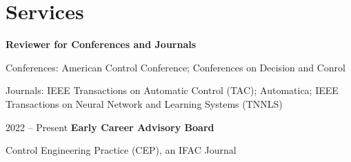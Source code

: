 \section{Services}
\begin{twocolentry}{}
\textbf{Reviewer for Conferences and Journals}\end{twocolentry}
\vspace{0.10 cm}
\begin{onecolentry}
\begin{highlights}
\item Conferences: American Control Conference; Conferences on Decision and Conrol
\item Journals: IEEE Transactions on Automatic Control (TAC); Automatica; IEEE Transactions on Neural Network and Learning Systems (TNNLS)
\end{highlights}
\end{onecolentry}
\vspace{0.20 cm}


\begin{twocolentry}{2022 -- Present}
\textbf{Early Career Advisory Board}\end{twocolentry}
\vspace{0.10 cm}
\begin{onecolentry}
\begin{highlights}
\item Control Engineering Practice (CEP), an IFAC Journal
\end{highlights}
\end{onecolentry}
\vspace{0.20 cm}
